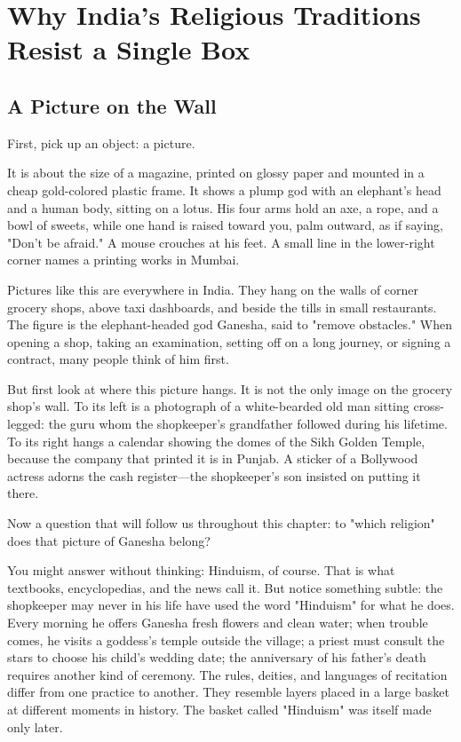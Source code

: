 \chapter[India: Traditions Beyond One Box]{Why India's Religious Traditions Resist a Single Box}
\section{A Picture on the Wall}
First, pick up an object: a picture.

It is about the size of a magazine, printed on glossy paper and mounted in a cheap gold-colored plastic frame. It shows a plump god with an elephant's head and a human body, sitting on a lotus. His four arms hold an axe, a rope, and a bowl of sweets, while one hand is raised toward you, palm outward, as if saying, "Don't be afraid." A mouse crouches at his feet. A small line in the lower-right corner names a printing works in Mumbai.

Pictures like this are everywhere in India. They hang on the walls of corner grocery shops, above taxi dashboards, and beside the tills in small restaurants. The figure is the elephant-headed god Ganesha, said to "remove obstacles." When opening a shop, taking an examination, setting off on a long journey, or signing a contract, many people think of him first.

But first look at where this picture hangs. It is not the only image on the grocery shop's wall. To its left is a photograph of a white-bearded old man sitting cross-legged: the guru whom the shopkeeper's grandfather followed during his lifetime. To its right hangs a calendar showing the domes of the Sikh Golden Temple, because the company that printed it is in Punjab. A sticker of a Bollywood actress adorns the cash register---the shopkeeper's son insisted on putting it there.

Now a question that will follow us throughout this chapter: to "which religion" does that picture of Ganesha belong?

You might answer without thinking: Hinduism, of course. That is what textbooks, encyclopedias, and the news call it. But notice something subtle: the shopkeeper may never in his life have used the word "Hinduism" for what he does. Every morning he offers Ganesha fresh flowers and clean water; when trouble comes, he visits a goddess's temple outside the village; a priest must consult the stars to choose his child's wedding date; the anniversary of his father's death requires another kind of ceremony. The rules, deities, and languages of recitation differ from one practice to another. They resemble layers placed in a large basket at different moments in history. The basket called "Hinduism" was itself made only later.

